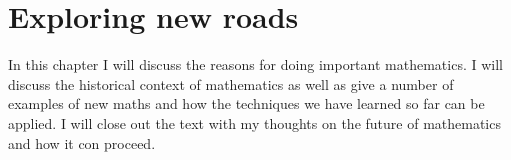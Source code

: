 \documentclass{book}
\begin{document}
\chapter{Exploring new roads}
In this chapter I will discuss the reasons for doing important mathematics.  I will discuss the historical context of mathematics as well as give a number of examples of new maths and how the techniques we have learned so far can be applied.  I will close out the text with my thoughts on the future of mathematics and how it con proceed.
\end{document}
